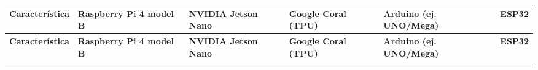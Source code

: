 
{\small
  \begin{longtable}[c]{p{2.2cm} p{2.4cm} p{2.4cm} p{2.4cm} p{2.4cm} p{2.4cm}}
    \hline
    \textbf{Característica}                                                                                                                                &
    \textbf{Raspberry Pi 4 model B}                                                                                                                        &
    \textbf{NVIDIA Jetson Nano}                                                                                                                            &
    \textbf{Google Coral (TPU)}                                                                                                                            &
    \textbf{Arduino (ej. UNO/Mega)}                                                                                                                        &
    \textbf{ESP32}                                                                                                                                           \\
    \hline
    \endfirsthead

    \hline
    \textbf{Característica}                                                                                                                                &
    \textbf{Raspberry Pi 4 model B}                                                                                                                        &
    \textbf{NVIDIA Jetson Nano}                                                                                                                            &
    \textbf{Google Coral (TPU)}                                                                                                                            &
    \textbf{Arduino (ej. UNO/Mega)}                                                                                                                        &
    \textbf{ESP32}                                                                                                                                           \\
    \hline
    \endhead
    \endfoot
    \endlastfoot


\end{longtable}}
